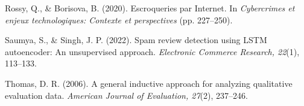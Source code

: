 \documentclass[11pt,a4paper]{article}
\begin{document}
{\begin{list}{}{
  \setlength{\leftmargin}{1.4em}
  \setlength{\itemindent}{-1.4em}
  \setlength{\itemsep}{0.38em}
  \setlength{\parsep}{0pt}
}
\item Rossy, Q., \& Borisova, B. (2020). Escroqueries par Internet. In \emph{Cybercrimes et enjeux technologiques: Contexte et perspectives} (pp. 227--250).
\item Saumya, S., \& Singh, J. P. (2022). Spam review detection using LSTM autoencoder: An unsupervised approach. \emph{Electronic Commerce Research, 22}(1), 113--133.
\item Thomas, D. R. (2006). A general inductive approach for analyzing qualitative evaluation data. \emph{American Journal of Evaluation, 27}(2), 237--246.
\end{list}
}
\end{document}
